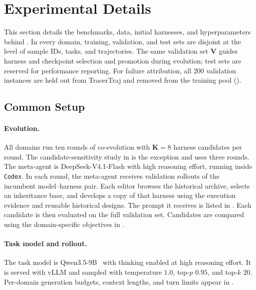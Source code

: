 \documentclass[11pt,a4paper]{article}
\begin{document}



\clearpage
\appendix

\section{Experimental Details}
\label{app:exp}

This section details the benchmarks, data, initial harnesses, and hyperparameters behind . In every domain, training, validation, and test sets are disjoint at the level of sample IDs, tasks, and trajectories. The same validation set $\mathbf{V}$ guides harness and checkpoint selection and promotion during evolution; test sets are reserved for performance reporting. For failure attribution, all 200 validation instances are held out from TracerTraj and removed from the training pool ().

\subsection{Common Setup}
\label{app:common}

\paragraph{Evolution.}
All domains run ten rounds of co-evolution with $\mathbf{K}{=}8$ harness candidates per round. The candidate-sensitivity study in  is the exception and uses three rounds. The meta-agent is DeepSeek-V4.1-Flash with high reasoning effort, running inside \texttt{Codex}. In each round, the meta-agent receives validation rollouts of the incumbent model--harness pair. Each editor browses the historical archive, selects an inheritance base, and develops a copy of that harness using the execution evidence and reusable historical designs. The prompt it receives is listed in . Each candidate is then evaluated on the full validation set. Candidates are compared using the domain-specific objectives in .

\paragraph{Task model and rollout.}
The task model is Qwen3.5-9B~\citep{qwen2026qwen35} with thinking enabled at high reasoning effort. It is served with vLLM and sampled with temperature $1.0$, top-$p$ $0.95$, and top-$k$ $20$. Per-domain generation budgets, context lengths, and turn limits appear in .
\end{document}
